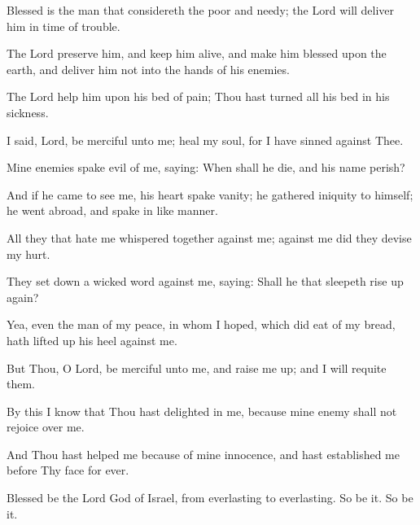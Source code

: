 Blessed is the man that considereth the poor and needy; the Lord will deliver him in time of trouble.

The Lord preserve him, and keep him alive, and make him blessed upon the earth, and deliver him not into the hands of his enemies.

The Lord help him upon his bed of pain; Thou hast turned all his bed in his sickness.

I said, Lord, be merciful unto me; heal my soul, for I have sinned against Thee.

Mine enemies spake evil of me, saying: When shall he die, and his name perish?

And if he came to see me, his heart spake vanity; he gathered iniquity to himself; he went abroad, and spake in like manner.

All they that hate me whispered together against me; against me did they devise my hurt.

They set down a wicked word against me, saying: Shall he that sleepeth rise up again?

Yea, even the man of my peace, in whom I hoped, which did eat of my bread, hath lifted up his heel against me.

But Thou, O Lord, be merciful unto me, and raise me up; and I will requite them.

By this I know that Thou hast delighted in me, because mine enemy shall not rejoice over me.

And Thou hast helped me because of mine innocence, and hast established me before Thy face for ever.

Blessed be the Lord God of Israel, from everlasting to everlasting. So be it. So be it.

